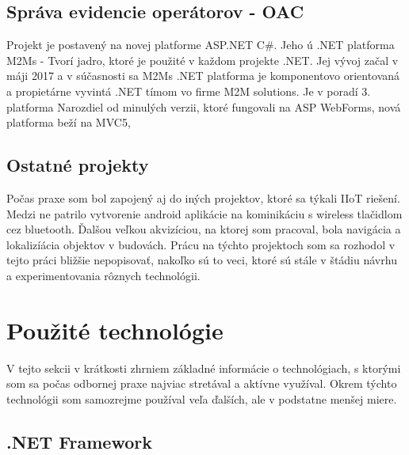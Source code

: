\documentclass[11pt, oneside]{report}
\begin{document}
\section{Správa evidencie operátorov - OAC}
Projekt je postavený na novej platforme ASP.NET C\#. Jeho ú
.NET platforma M2Ms - Tvorí jadro, ktoré je použité v každom projekte .NET. Jej vývoj začal v máji 2017 a v súčasnosti sa  M2Ms .NET platforma je komponentovo orientovaná a propietárne vyvintá .NET tímom  vo  firme M2M solutions. Je v poradí 3. platforma Narozdiel od minulých verzii, ktoré fungovali na ASP WebForms, nová platforma beží na MVC5,

\section{Ostatné projekty}
Počas praxe som bol zapojený aj do iných projektov, ktoré sa týkali IIoT riešení. Medzi ne patrilo vytvorenie android aplikácie na kominikáciu s wireless tlačidlom cez bluetooth. Ďalšou veľkou akvizíciou, na ktorej som pracoval, bola navigácia a lokalizíácia objektov v budovách. Prácu na týchto projektoch som sa rozhodol v tejto práci bližšie nepopisovať, nakoľko sú to veci, ktoré sú stále v štádiu návrhu a experimentovania rôznych technológii.

\chapter{Použité technológie}
V tejto sekcii v krátkosti zhrniem základné informácie o technológiach, s ktorými som sa počas odbornej praxe najviac stretával a aktívne využíval. Okrem týchto  technológii som samozrejme používal veľa ďalších, ale v podstatne menšej miere.

\section{.NET Framework}
\end{document}
